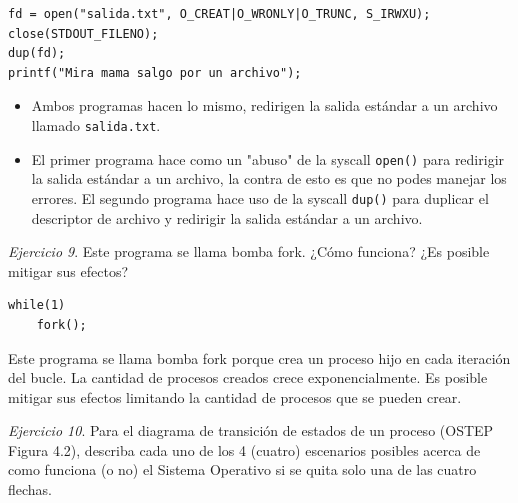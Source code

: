 \documentclass[12pt]{article}
\begin{document}
\begin{lstlisting}[style=CStyle]
fd = open("salida.txt", O_CREAT|O_WRONLY|O_TRUNC, S_IRWXU);
close(STDOUT_FILENO);
dup(fd);
printf("Mira mama salgo por un archivo");
\end{lstlisting}

\begin{rta}
    \begin{itemize}
        \item Ambos programas hacen lo mismo, redirigen la salida estándar a un archivo llamado \texttt{salida.txt}.
        \item El primer programa hace como un "abuso" de la syscall \texttt{open()} para redirigir la salida estándar a un archivo, la contra de esto es que no podes manejar los errores. El segundo programa hace uso de la syscall \texttt{dup()} para duplicar el descriptor de archivo y redirigir la salida estándar a un archivo.
    \end{itemize}
\end{rta}

\noindent \textit{Ejercicio 9}. Este programa se llama bomba fork. ¿Cómo funciona? ¿Es posible mitigar sus efectos?

\begin{lstlisting}[style=CStyle]
while(1)
    fork();
\end{lstlisting}

\begin{rta}
    Este programa se llama bomba fork porque crea un proceso hijo en cada iteración del bucle. La cantidad de procesos creados crece exponencialmente. Es posible mitigar sus efectos limitando la cantidad de procesos que se pueden crear.
\end{rta}

\noindent \textit{Ejercicio 10}. Para el diagrama de transición de estados de un proceso (OSTEP Figura 4.2), describa cada uno de los 4 (cuatro) escenarios posibles acerca de como funciona (o no) el Sistema Operativo si se quita solo una de las cuatro flechas.
\end{document}
